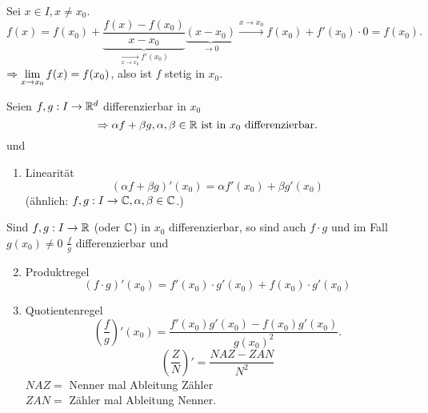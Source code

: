 \documentclass[../ana1.tex]{subfiles}
\begin{document}
\begin{bew}
    Sei \( x\in I, x \neq x_0 \).
    \[ f(x) = f(x_0) + \underbrace{
    \frac{f(x) - f(x_0)}{x - x_0} }_{
        \underset{x\rightarrow x_0}{\longrightarrow} f'(x_0)
    } \underbrace{(x-x_0)}_{\rightarrow 0} 
    \overset{x\rightarrow x_0 }{\longrightarrow} 
    f(x_0) + f'(x_0) \cdot 0 = f(x_0). \]
    \( \Rightarrow \lim\limits_{x\rightarrow x_0} f(x) = f(x_0) \), also ist
    \( f \) stetig in \( x_0 \).
\end{bew}
\begin{satz}[Differentiationsregeln]
    Seien \( f, g: I \rightarrow \mathbb{R}^d \) differenzierbar in \(x_0\)
    \[ \Rightarrow \alpha f + \beta g, \alpha, \beta \in \mathbb{R} 
    \text{ ist in } x_0 \text{ differenzierbar.} \]
    und 
    \begin{enumerate}
        \item Linearität 
        \[ (\alpha f + \beta g)'(x_0) = \alpha f'(x_0) 
        + \beta g'(x_0) \]
        (ähnlich: \( f, g: I \rightarrow \mathbb{C}, \alpha, \beta \in \mathbb{C} \).)
    \end{enumerate}
    Sind \( f, g: I \rightarrow \mathbb{R} \) (oder \( \mathbb{C} \)) in \(x_0\)
    differenzierbar, so sind auch \( f\cdot g \) und im Fall 
    \( g(x_0) \neq 0 \) \( \frac{f}{g} \) differenzierbar und 
    \begin{enumerate}
        \setcounter{enumi}{1}
        \item Produktregel
        \[ (f \cdot g)'(x_0) = f'(x_0) \cdot g'(x_0) 
        + f(x_0) \cdot g'(x_0) \]
        \item Quotientenregel
        \[ \left( \frac{f}{g} \right)'(x_0) 
        = \frac{ f'(x_0) g'(x_0) - f(x_0) g'(x_0) }{ {g(x_0)}^2 }. \]
        \[ (\frac{Z}{N})' = \frac{NAZ - ZAN}{N^2} \]
        \( NAZ = \) Nenner mal Ableitung Zähler\\
        \( ZAN = \) Zähler mal Ableitung Nenner.
    \end{enumerate}
\end{satz}
\end{document}
